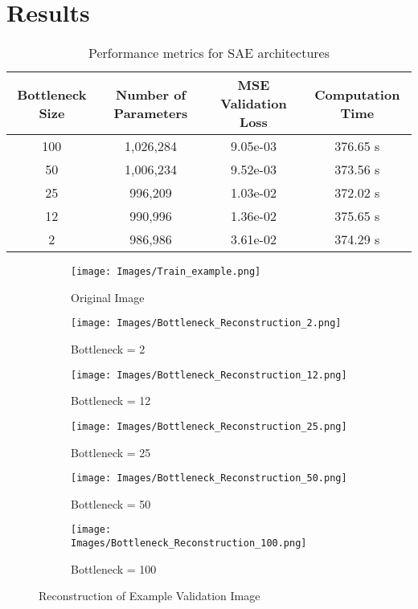 \documentclass[conference]{IEEEtran}
\begin{document}
\section{Results}
\begin{table*}[htb!]
	\centering
	\caption{Performance metrics for SAE architectures}
	\label{tab:SAE_construct}
	\begin{tabular}{|c|c|c|c|}
		\hline
		Bottleneck Size & Number of Parameters & MSE Validation Loss & Computation Time \\ \hline
		100             & 1,026,284            & 9.05e-03            & 376.65 s         \\ \hline
		50              & 1,006,234            & 9.52e-03            & 373.56 s         \\ \hline
		25              & 996,209              & 1.03e-02            & 372.02 s         \\ \hline
		12              & 990,996              & 1.36e-02            & 375.65 s         \\ \hline
		2               & 986,986              & 3.61e-02            & 374.29 s         \\ \hline
	\end{tabular}
\end{table*}
\begin{figure*}[t]
	\begin{subfigure}{.16\textwidth}{
		\texttt{[image: Images/Train\_example.png]}
		\caption{Original Image}
		\label{fig:toy_img}
	}
	\end{subfigure}
	\begin{subfigure}{.16\textwidth}{
			\texttt{[image: Images/Bottleneck\_Reconstruction\_2.png]}
			\caption{Bottleneck = 2}
			\label{fig:BN2}
		}
	\end{subfigure}
	\begin{subfigure}{.16\textwidth}{
			\texttt{[image: Images/Bottleneck\_Reconstruction\_12.png]}
			\caption{Bottleneck = 12}
			\label{fig:BN12}
		}
	\end{subfigure}
	\begin{subfigure}{.16\textwidth}{
			\texttt{[image: Images/Bottleneck\_Reconstruction\_25.png]}
			\caption{Bottleneck = 25}
			\label{fig:BN25}
		}
	\end{subfigure} 
	\begin{subfigure}{.16\textwidth}{
		\texttt{[image: Images/Bottleneck\_Reconstruction\_50.png]}
		\caption{Bottleneck = 50}
		\label{fig:BN50}
	}
\end{subfigure} 
	\begin{subfigure}{.16\textwidth}{
		\texttt{[image: Images/Bottleneck\_Reconstruction\_100.png]}
		\caption{Bottleneck = 100}
		\label{fig:BN100}
	}
\end{subfigure} 
	
	\caption{Reconstruction of Example Validation Image}
	\centering
	\label{fig:LC}
\end{figure*} 
\end{document}
